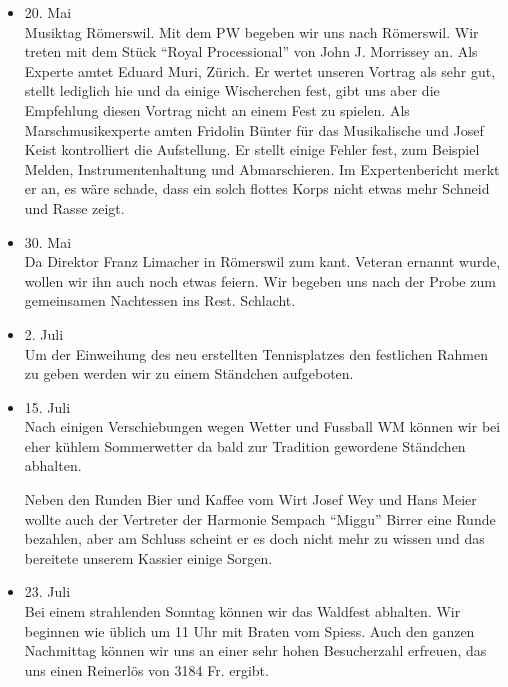 \begin{history}
\begin{itemize}
        \item[]20. Mai\\
        Musiktag Römerswil. Mit dem PW begeben wir uns nach Römerswil. Wir
        treten mit dem Stück \enquote{Royal Processional} von John J. Morrissey an.
        Als Experte amtet Eduard Muri, Zürich. Er wertet unseren Vortrag als
        sehr gut, stellt lediglich hie und da einige Wischerchen fest, gibt uns
        aber die Empfehlung diesen Vortrag nicht an einem Fest zu spielen. Als
        Marschmusikexperte amten Fridolin Bünter für das Musikalische und Josef
        Keist kontrolliert die Aufstellung. Er stellt einige Fehler fest, zum
        Beispiel Melden, Instrumentenhaltung und Abmarschieren. Im
        Expertenbericht merkt er an, es wäre schade, dass ein solch flottes
        Korps nicht etwas mehr Schneid und Rasse zeigt.

        \item[]30. Mai\\
        Da Direktor Franz Limacher in Römerswil zum kant. Veteran ernannt wurde,
        wollen wir ihn auch noch etwas feiern. Wir begeben uns nach der Probe
        zum gemeinsamen Nachtessen ins Rest. Schlacht.

        \item[]2. Juli\\
        Um der Einweihung des neu erstellten Tennisplatzes den festlichen Rahmen
        zu geben werden wir zu einem Ständchen aufgeboten.

        \item[]15. Juli\\
        Nach einigen Verschiebungen wegen Wetter und Fussball WM können wir bei
        eher kühlem Sommerwetter da bald zur Tradition gewordene Ständchen
        abhalten.

        Neben den Runden Bier und Kaffee vom Wirt Josef Wey und Hans Meier
        wollte auch der Vertreter der Harmonie Sempach \enquote{Miggu} Birrer eine
        Runde bezahlen, aber am Schluss scheint er es doch nicht mehr zu wissen
        und das bereitete unserem Kassier einige Sorgen.

        \item[]23. Juli\\
        Bei einem strahlenden Sonntag können wir das Waldfest abhalten. Wir
        beginnen wie üblich um 11 Uhr mit Braten vom Spiess. Auch den ganzen
        Nachmittag können wir uns an einer sehr hohen Besucherzahl erfreuen, das
        uns einen Reinerlös von 3184 Fr. ergibt.


\end{itemize}
\end{history}
